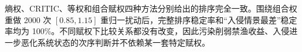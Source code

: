 熵权、CRITIC、等权和组合赋权四种方法分别给出的排序完全一致。围绕组合权重做 2000 次 $[0.85,1.15]$ 重归一扰动后，完整排序稳定率和“入侵情景最差”稳定率均为 100\%。不同赋权下比较关系都没有改变，因此污染削弱禁渔收益、入侵进一步恶化系统状态的次序判断并不依赖某一套特定赋权。
